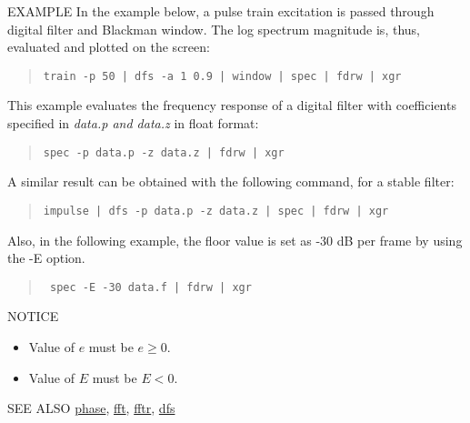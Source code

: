 \begin{qsection}{EXAMPLE}
In the example below, a pulse train excitation is passed
through digital filter and Blackman window.
The log spectrum magnitude is, thus, evaluated and plotted
on the screen:
\begin{quote}
  \verb!train -p 50 | dfs -a 1 0.9 | window | spec | fdrw | xgr !
\end{quote}
\par
This example evaluates the frequency response of
a digital filter with coefficients specified in {\em data.p and data.z}
in float format:
\begin{quote}
  \verb!spec -p data.p -z data.z | fdrw | xgr !
\end{quote}
A similar result can be obtained with the following command,
 for a stable filter:
\begin{quote}
  \verb!impulse | dfs -p data.p -z data.z | spec | fdrw | xgr !
\end{quote}

Also, in the following example, the floor value is set as -30 dB per frame by using the -E option.
 \begin{quote}
 \verb! spec -E -30 data.f | fdrw | xgr !
 \end{quote}


\end{qsection}

\begin{qsection}{NOTICE}
\begin{itemize}
\item Value of $e$ must be $e \geq 0$.
\item Value of $E$ must be $E < 0$.
\end{itemize}
\end{qsection}

\begin{qsection}{SEE ALSO}
\hyperlink{phase}{phase},
\hyperlink{fft}{fft},
\hyperlink{fftr}{fftr},
\hyperlink{dfs}{dfs}
\end{qsection}
